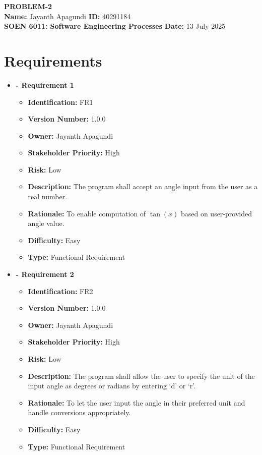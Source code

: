 \documentclass[11pt,a4paper,twoside]{article}
\begin{document}
\begin{center}
{\Large \bfseries PROBLEM-2} \\[0.2cm]
{\bfseries Name:} Jayanth Apagundi \hfill {\bfseries ID:} 40291184 \\[0.1cm]
{\bfseries SOEN 6011: Software Engineering Processes} \hfill {\bfseries Date:} 13 July 2025
\end{center}

\section*{Requirements}

\begin{itemize}[leftmargin=0pt,label={}]
\item \textbf{- Requirement 1}
\begin{itemize}
\item \textbf{Identification:} FR1
\item \textbf{Version Number:} 1.0.0
\item \textbf{Owner:} Jayanth Apagundi
\item \textbf{Stakeholder Priority:} High
\item \textbf{Risk:} Low
\item \textbf{Description:} The program shall accept an angle input from the user as a real number.
\item \textbf{Rationale:} To enable computation of $\tan(x)$ based on user-provided angle value.
\item \textbf{Difficulty:} Easy
\item \textbf{Type:} Functional Requirement
\end{itemize}

\item \textbf{- Requirement 2}
\begin{itemize}
\item \textbf{Identification:} FR2
\item \textbf{Version Number:} 1.0.0
\item \textbf{Owner:} Jayanth Apagundi
\item \textbf{Stakeholder Priority:} High
\item \textbf{Risk:} Low
\item \textbf{Description:} The program shall allow the user to specify the unit of the input angle as degrees or radians by entering ‘d’ or ‘r’.
\item \textbf{Rationale:} To let the user input the angle in their preferred unit and handle conversions appropriately.
\item \textbf{Difficulty:} Easy
\item \textbf{Type:} Functional Requirement
\end{itemize}


\end{itemize}
\end{document}
